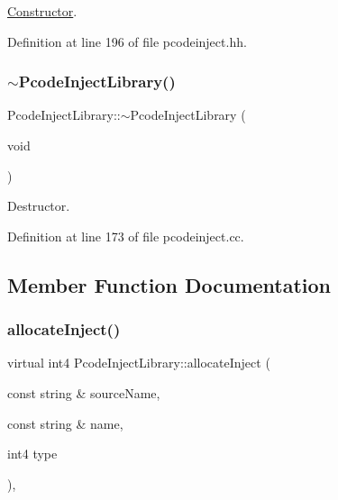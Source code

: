 \mbox{\hyperlink{class_constructor}{Constructor}}. 



Definition at line 196 of file pcodeinject.\+hh.

\mbox{\label{class_pcode_inject_library_ae7a4417915e073736f49f698b95eb450}} 
\subsubsection{\texorpdfstring{$\sim$PcodeInjectLibrary()}{~PcodeInjectLibrary()}}
{\footnotesize\ttfamily Pcode\+Inject\+Library\+::$\sim$\+Pcode\+Inject\+Library (\begin{DoxyParamCaption}\item[{void}]{ }\end{DoxyParamCaption})\hspace{0.3cm}{\ttfamily [virtual]}}



Destructor. 



Definition at line 173 of file pcodeinject.\+cc.



\subsection{Member Function Documentation}
\mbox{\label{class_pcode_inject_library_a386a617992fcdd31d9abbf0728126686}} 
\subsubsection{\texorpdfstring{allocateInject()}{allocateInject()}}
{\footnotesize\ttfamily virtual int4 Pcode\+Inject\+Library\+::allocate\+Inject (\begin{DoxyParamCaption}\item[{const string \&}]{source\+Name,  }\item[{const string \&}]{name,  }\item[{int4}]{type }\end{DoxyParamCaption})\hspace{0.3cm}{\ttfamily [protected]}, {}}



